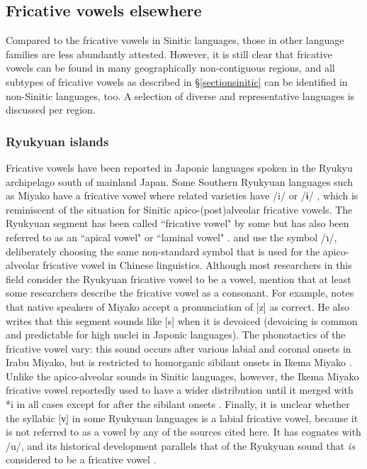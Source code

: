 \documentclass[output=paper,colorlinks,citecolor=brown,chinesefont]{langscibook}
\begin{document}

\subsection{Fricative vowels elsewhere} \label{non-sinitic}
Compared to the fricative vowels in Sinitic languages, those in other language families are less abundantly attested. However, it is still clear that fricative vowels can be found in many geographically non-contiguous regions, and all subtypes of fricative vowels as described in §\ref{sectionsinitic} can be identified in non-Sinitic languages, too. A selection of diverse and representative languages is discussed per region.

\subsubsection{Ryukyuan islands}
Fricative vowels have been reported in Japonic languages spoken in the Ryukyu archipelago south of mainland Japan. Some Southern Ryukyuan languages such as Miyako have a fricative vowel where related varieties have /i/ or /ɨ/ \citep{Jarosz_2018}, which is reminiscent of the situation for Sinitic apico-(post)alveolar fricative vowels. The Ryukyuan segment has been called ``fricative vowel" by some \citep{Pellard&Hayashi_2012} but has also been referred to as an ``apical vowel" \citep{Jarosz_2018} or ``laminal vowel" \citep{Aoi&Niigata_2013}. \citet{Jarosz_2018} and \citet{Pellard&Hayashi_2012} use the symbol /ɿ/, deliberately choosing the same non-standard symbol that is used for the apico-alveolar fricative vowel in Chinese linguistics. Although most researchers in this field consider the Ryukyuan fricative vowel to be a vowel, \citet[15]{Pellard&Hayashi_2012} mention that at least some researchers describe the fricative vowel as a consonant. For example, \citet{Sawaki_2000} notes that native speakers of Miyako accept a pronunciation of [z] as correct. He also writes that this segment sounds like [s] when it is devoiced (devoicing is common and predictable for high nuclei in Japonic languages). The phonotactics of the fricative vowel vary: this sound occurs after various labial and coronal onsets in Irabu Miyako, but is restricted to homorganic sibilant onsets in Ikema Miyako \citep{Pellard&Hayashi_2012}. Unlike the apico-alveolar sounds in Sinitic languages, however, the Ikema Miyako fricative vowel reportedly used to have a wider distribution until it merged with *i in all cases except for after the sibilant onsets \citep[16]{Pellard&Hayashi_2012}. Finally, it is unclear whether the syllabic [v̩] in some Ryukyuan languages is a labial fricative vowel, because it is not referred to as a vowel by any of the sources cited here. It has cognates with /u/, and its historical development parallels that of the Ryukyuan sound that \textit{is} considered to be a fricative vowel \citep{Jarosz_2018}.
\end{document}
